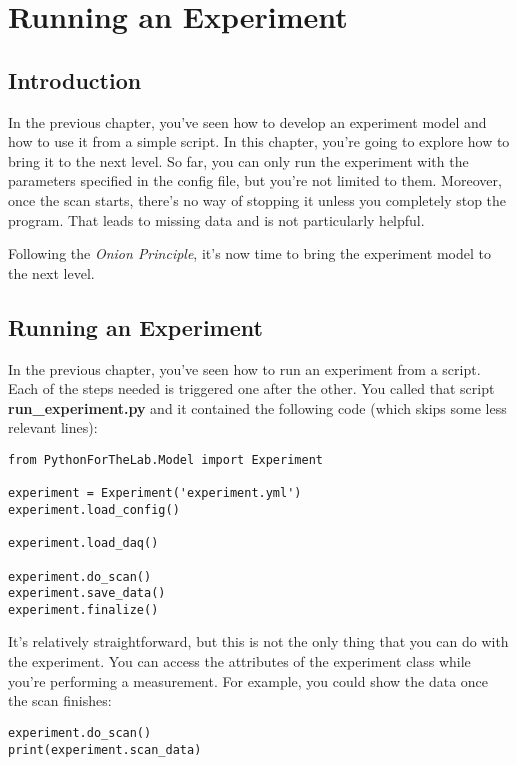 \chapter{Running an Experiment}\label{ch:run-experiment}

\section{Introduction}\label{sec:run-experiment-introduction}
In the previous chapter, you've seen how to develop an experiment model and how to use it from a simple script. In this chapter, you're going to explore how to bring it to the next level. So far, you can only run the experiment with the parameters specified in the config file, but you're not limited to them. Moreover, once the scan starts, there's no way of stopping it unless you completely stop the program. That leads to missing data and is not particularly helpful.

Following the \emph{Onion Principle}, it's now time to bring the experiment model to the next level.

\section{Running an Experiment}\label{sec:running-experiment}
In the previous chapter, you've seen how to run an experiment from a script. Each of the steps needed is triggered one after the other. You called that script \textbf{run\_experiment.py} and it contained the following code (which skips some less relevant lines):

\begin{verbatim}
from PythonForTheLab.Model import Experiment

experiment = Experiment('experiment.yml')
experiment.load_config()

experiment.load_daq()

experiment.do_scan()
experiment.save_data()
experiment.finalize()
\end{verbatim}

It's relatively straightforward, but this is not the only thing that you can do with the experiment. You can access the attributes of the experiment class while you're performing a measurement. For example, you could show the data once the scan finishes:

\begin{verbatim}
experiment.do_scan()
print(experiment.scan_data)
\end{verbatim}

